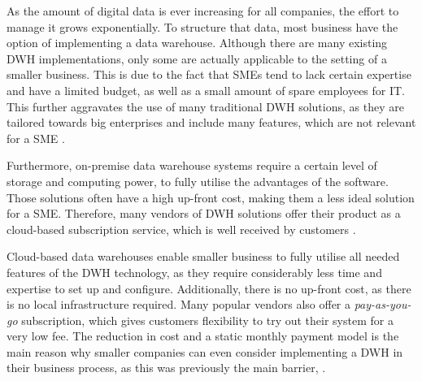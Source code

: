 \documentclass[../paper.tex]{subfiles}
\begin{document}
As the amount of digital data is ever increasing for all companies, the effort to manage it grows exponentially. To structure that data, most business have the option of implementing a data warehouse. Although there are many existing DWH implementations, only some are actually applicable to the setting of a smaller business. This is due to the fact that SMEs tend to lack certain expertise and have a limited budget, as well as a small amount of spare employees for IT. This further aggravates the use of many traditional DWH solutions, as they are tailored towards big enterprises and include many features, which are not relevant for a SME \cite{Raj2016}.

Furthermore, on-premise data warehouse systems require a certain level of storage and computing power, to fully utilise the advantages of the software. Those solutions often have a high up-front cost, making them a less ideal solution for a SME. Therefore, many vendors of DWH solutions offer their product as a cloud-based subscription service, which is well received by customers \cite{Agostino2013}.

Cloud-based data warehouses enable smaller business to fully utilise all needed features of the DWH technology, as they require considerably less time and expertise to set up and configure. Additionally, there is no up-front cost, as there is no local infrastructure required. Many popular vendors also offer a \textit{pay-as-you-go} subscription, which gives customers flexibility to try out their system for a very low fee. The reduction in cost and a static monthly payment model is the main reason why smaller companies can even consider implementing a DWH in their business process, as this was previously the main barrier, \cite{Fernandes2016}.
\end{document}
